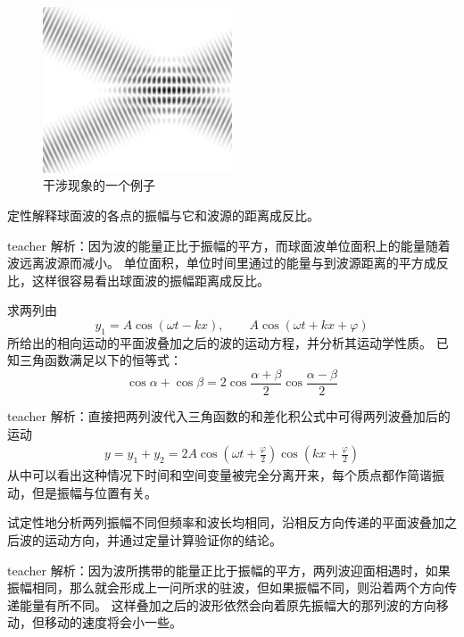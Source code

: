 \begin{figure}[ht]
\centering
\includegraphics[width=0.5\textwidth]{images/Interferences_plane_waves.pdf}
\caption{干涉现象的一个例子}\label{fig: ow-波的干涉}
\end{figure}


\begin{example}
定性解释球面波的各点的振幅与它和波源的距离成反比。
\begin{taggedblock}{teacher}
\newline
解析：因为波的能量正比于振幅的平方，而球面波单位面积上的能量随着波远离波源而减小。
单位面积，单位时间里通过的能量与到波源距离的平方成反比，这样很容易看出球面波的振幅距离成反比。
\end{taggedblock}
\end{example}

\begin{example}
求两列由
\[y_1 = A\cos(\omega t-kx),\qquad A\cos(\omega t + kx +\varphi)\]
所给出的相向运动的平面波叠加之后的波的运动方程，并分析其运动学性质。
已知三角函数满足以下的恒等式：
\[\cos\alpha+\cos\beta = 2\cos\frac{\alpha+ \beta}{2}\cos\frac{\alpha- \beta}{2}\]
\begin{taggedblock}{teacher}
\noindent
解析：直接把两列波代入三角函数的和差化积公式中可得两列波叠加后的运动
\begin{eqnarray*}
y = y_1+y_2 = 2A\cos(\omega t +\frac{\varphi}{2})\cos(kx +\frac{\varphi}{2})
\end{eqnarray*}
从中可以看出这种情况下时间和空间变量被完全分离开来，每个质点都作简谐振动，但是振幅与位置有关。
\end{taggedblock}
\end{example}

\begin{example}
试定性地分析两列振幅不同但频率和波长均相同，沿相反方向传递的平面波叠加之后波的运动方向，并通过定量计算验证你的结论。
\begin{taggedblock}{teacher}
\newline
解析：因为波所携带的能量正比于振幅的平方，两列波迎面相遇时，如果振幅相同，那么就会形成上一问所求的驻波，但如果振幅不同，则沿着两个方向传递能量有所不同。
这样叠加之后的波形依然会向着原先振幅大的那列波的方向移动，但移动的速度将会小一些。


\end{taggedblock}
\end{example}

